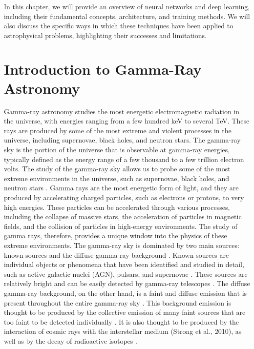 \noindent 
In this chapter, we will provide an overview of neural networks and deep learning, including their fundamental concepts, architecture, and training methods. We will also discuss the specific ways in which these techniques have been applied to astrophysical problems, highlighting their successes and limitations.

\section{Introduction to Gamma-Ray Astronomy}
\label{s:Introduction-to-Gamma-Ray-Astronomy}

Gamma-ray astronomy studies the most energetic electromagnetic radiation in the universe, with energies ranging from a few hundred keV to several TeV. These rays are produced by some of the most extreme and violent processes in the universe, including supernovae, black holes, and neutron stars.
The gamma-ray sky is the portion of the universe that is observable at gamma-ray energies, typically defined as the energy range of a few thousand to a few trillion electron volts. The study of the gamma-ray sky allows us to probe some of the most extreme environments in the universe, such as supernovae, black holes, and neutron stars \cite{Fishman1995}.
Gamma rays are the most energetic form of light, and they are produced by accelerating charged particles, such as electrons or protons, to very high energies. These particles can be accelerated through various processes, including the collapse of massive stars, the acceleration of particles in magnetic fields, and the collision of particles in high-energy environments. The study of gamma rays, therefore, provides a unique window into the physics of these extreme environments.
The gamma-ray sky is dominated by two main sources: known sources and the diffuse gamma-ray background \cite{Ackermann2015}. Known sources are individual objects or phenomena that have been identified and studied in detail, such as active galactic nuclei (AGN), pulsars, and supernovae \cite{Kelley2020}. These sources are relatively bright and can be easily detected by gamma-ray telescopes \cite{Abdo}.
The diffuse gamma-ray background, on the other hand, is a faint and diffuse emission that is present throughout the entire gamma-ray sky \cite{Ackermann2015}. This background emission is thought to be produced by the collective emission of many faint sources that are too faint to be detected individually \cite{Abdo}. It is also thought to be produced by the interaction of cosmic rays with the interstellar medium (Strong et al., 2010), as well as by the decay of radioactive isotopes \cite{Kelley2020}.
